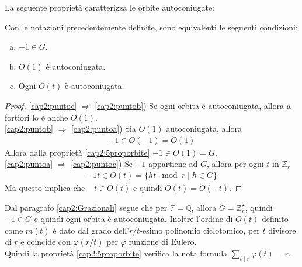 La seguente proprietà caratterizza le orbite autoconiugate:
\begin{prop}
Con le notazioni precedentemente definite, sono equivalenti le seguenti condizioni:
\begin{enumerate}[(a)]
   \item \label{cap2:puntoa} $-1 \in G$.
   \item \label{cap2:puntob} $ O(1)$ è autoconiugata.
   \item \label{cap2:puntoc} Ogni $O(t)$ è autoconiugata.
\end{enumerate}
\end{prop}
\begin{proof}
\ref{cap2:puntoc} $\Rightarrow$ \ref{cap2:puntob}) Se ogni orbita è autoconiugata, allora a fortiori lo è anche $O(1)$. \\
\ref{cap2:puntob} $\Rightarrow$ \ref{cap2:puntoa}) Sia $O(1)$ autoconiugata, allora
          \begin{align*}
            -1 \in O(-1) = O(1)
          \end{align*}
          Allora dalla proprietà \ref{cap2:5proporbite} $-1 \in O(1) = G$.\\
\ref{cap2:puntoa} $\Rightarrow$ \ref{cap2:puntoc}) Se $-1$ appartiene ad $G$, allora per ogni $t$ in $\mathbb{Z}_{r}$
          \begin{align*}
            -1t \in O(t) = \lbrace ht \mod{r} \mid h \in G \rbrace
          \end{align*}
          Ma questo implica che $-t \in O(t)$ e quindi $O(t) = O(-t)$.
\end{proof}
\begin{osservazione}
   Dal paragrafo \ref{cap2:Grazionali} segue che per $\mathbb{F}=\mathbb{Q}$, allora $G=\mathbb{Z}_{r}^{\star}$, quindi $-1 \in G$ e quindi ogni orbita è autoconiugata. Inoltre l'ordine di $O(t)$ definito come $m(t)$ è dato dal grado dell'$r/t$-esimo polinomio ciclotomico, per $t$ divisore di $r$ e coincide con $\varphi(r/t)$ per $\varphi$ funzione di Eulero. \\
   Quindi la proprietà \ref{cap2:5proporbite} verifica la nota formula $\sum_{t \mid r} \varphi(t) = r$.
\end{osservazione}

